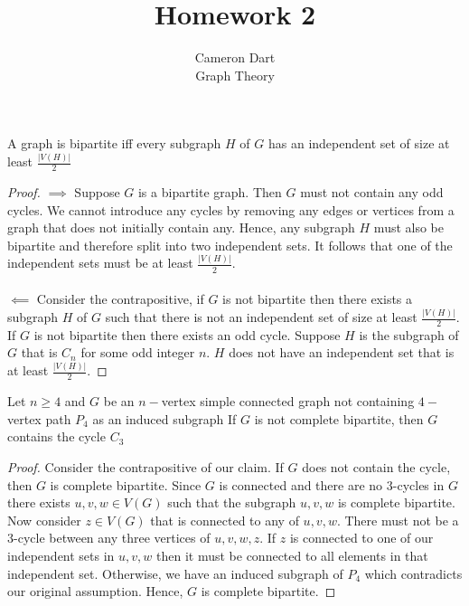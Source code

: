 \documentclass{article}
\newenvironment{claim}[2][Claim]{\begin{trivlist}
		\item[\hskip \labelsep {\bfseries #1}\hskip \labelsep {\bfseries #2}]}{\end{trivlist}}
\begin{document}
\title{Homework 2} %
\author{Cameron Dart\\ Graph Theory} %

\maketitle

\begin{claim}{1}
	A graph is bipartite iff every subgraph $H$ of $G$ has an independent set of size at least $\frac{|V(H)|}{2}$
\end{claim}

\begin{proof}
	$\implies $ Suppose $G$ is a bipartite graph. Then $G$ must not contain any odd cycles. We cannot introduce any cycles by removing any edges or vertices from a graph that does not initially contain any. Hence, any subgraph $H$ must also be bipartite and therefore split into two independent sets. It follows that one of the independent sets must be at least $\frac{|V(H)|}{2}$.\\ \\
	$\impliedby$ Consider the contrapositive, if $G$ is not bipartite then there exists a subgraph $H$ of $G$ such that there is not an independent set of size at least $\frac{|V(H)|}{2}$. If $G$ is not bipartite then there exists an odd cycle. Suppose $H$ is the subgraph of $G$ that is $C_n$ for some odd integer $n$. $H$ does not have an independent set that is at least $\frac{|V(H)|}{2}$.
	\end{proof}

\begin{claim}{2.a}
	Let $n \geq 4$ and $G$ be an $n-$vertex simple connected graph not containing $4-$vertex path $P_4$ as an induced subgraph 
	If $G$ is not complete bipartite, then $G$ contains the cycle $C_3$
\end{claim}

\begin{proof}
	Consider the contrapositive of our claim. If $G$ does not contain the cycle, then $G$ is complete bipartite. Since $G$ is connected and there are no $3$-cycles in $G$ there exists $u,v,w \in V(G)$ such that the subgraph $u,v,w$ is complete bipartite. Now consider $z \in V(G)$ that is connected to any of $u,v,w$. There must not be a 3-cycle between any three vertices of $u,v,w,z$. If $z$ is connected to one of our independent sets in $u,v,w$ then it must be connected to all elements in that independent set. Otherwise, we have an induced subgraph of $P_4$ which contradicts our original assumption. Hence, $G$ is complete bipartite.
\end{proof}
\end{document}
